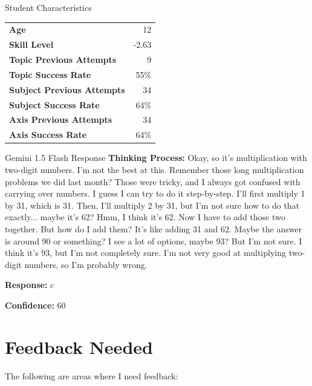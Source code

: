\documentclass[
    a4paper, %
    10pt, %
    twoside %
]{LTJournalArticle}
\begin{document}
\begin{studentbox}{Student Characteristics}
    \begin{tabularx}{\textwidth}{Xr}
        \textbf{Age} & 12 \\
        \textbf{Skill Level} & -2.63 \\
        \textbf{Topic Previous Attempts} & 9 \\
        \textbf{Topic Success Rate} & 55\% \\
        \textbf{Subject Previous Attempts} & 34 \\
        \textbf{Subject Success Rate} & 64\% \\
        \textbf{Axis Previous Attempts} & 34 \\
        \textbf{Axis Success Rate} & 64\% \\
    \end{tabularx}
\end{studentbox}

\begin{llmbox}{Gemini 1.5 Flash Response}
    \textbf{Thinking Process:} Okay, so it's multiplication with two-digit numbers.  I'm not the best at this.  Remember those long multiplication problems we did last month?  Those were tricky, and I always got confused with carrying over numbers. I guess I can try to do it step-by-step. I'll first multiply 1 by 31, which is 31. Then, I'll multiply 2 by 31, but I'm not sure how to do that exactly... maybe it's 62?  Hmm, I think it's 62. Now I have to add those two together.  But how do I add them? It's like adding 31 and 62. Maybe the answer is around 90 or something? I see a lot of options, maybe 93? But I'm not sure.  I think it's 93, but I'm not completely sure.  I'm not very good at multiplying two-digit numbers, so I'm probably wrong.
    
    \textbf{Response:} c
    
    \textbf{Confidence:} 60
\end{llmbox}

\section{Feedback Needed}

The following are areas where I need feedback:
\end{document}
